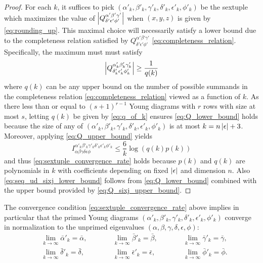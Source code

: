 \documentclass[notitlepage, 10pt]{article}
\begin{document}
\begin{proof}
    For each $k$, it suffices to pick $(\alpha'_k, \beta'_k, \gamma'_k, \delta'_k, \epsilon'_k, \phi'_k)$ be the sextuple which maximizes the value of $\left|Q^{\alpha'\beta'\gamma'}_{\delta'\epsilon'\phi'}\right|$ when $(x,y,z)$ is given by \cref{eq:rounding_up}.
    This maximal choice will necessarily satisfy a lower bound due to the completeness relation satisfied by $Q^{\alpha'\beta'\gamma'}_{\delta'\epsilon'\phi'}$ \cref{eq:completeness_relation}.
    Specifically, the maximum must must satisfy
    \begin{equation}
        \label{eq:Q_lower_bound}
        \left|Q^{\alpha'_k\beta'_k\gamma'_k}_{\delta'_k\epsilon'_k\phi'_k}\right| \geq \frac{1}{q(k)}
    \end{equation}
    where $q(k)$ can be any upper bound on the number of possible summands in the completeness relation \cref{eq:completeness_relation} viewed as a function of $k$.
    As there less than or equal to $(s+1)^{r-1}$ Young diagrams with $r$ rows with size at most $s$, letting $q(k)$ be given by \cref{eq:q_of_k} ensures \cref{eq:Q_lower_bound} holds because the size of any of $(\alpha'_k, \beta'_k, \gamma'_k, \delta'_k, \epsilon'_k, \phi'_k)$ is at most $k=n\left|\epsilon\right| + 3$.
    Moreover, applying \cref{eq:Q_upper_bound} yields
    \begin{equation}
        I^{\alpha'_k\beta'_k\gamma'_k\delta'_k\epsilon'_k\phi'_k}_{\alpha\beta\gamma\delta\epsilon\phi}
        \leq \frac{6}{k}\log (q(k)p(k))
    \end{equation}
    and thus \cref{eq:sextuple_convergence_rate} holds because $p(k)$ and $q(k)$ are polynomials in $k$ with coefficients depending on fixed $\left|\epsilon\right|$ and dimension $n$.
    Also \cref{eq:seq_ud_sixj_lower_bound} follows from \cref{eq:Q_lower_bound} combined with the upper bound provided by \cref{eq:Q_sixj_upper_bound}.
\end{proof}

\begin{rem}
    The convergence condition \cref{eq:sextuple_convergence_rate} above implies in particular that the primed Young diagrams $(\alpha'_k, \beta'_k, \gamma'_k, \delta'_k, \epsilon'_k, \phi'_k)$ converge in normalization to the unprimed eigenvalues $(\alpha,\beta,\gamma,\delta,\epsilon,\phi)$:
    \begin{equation}
        \label{eq:sextuple_convergence}
        \begin{alignedat}{3}
            &\lim_{k\to\infty} \bar \alpha'_k = \bar \alpha, \qquad
            &&\lim_{k\to\infty} \bar \beta'_k = \bar \beta, \qquad
            &&\lim_{k\to\infty} \bar \gamma'_k = \bar \gamma, \\
            &\lim_{k\to\infty} \bar \delta'_k = \bar \delta, \qquad
            &&\lim_{k\to\infty} \bar \epsilon'_k = \bar \epsilon, \qquad
            &&\lim_{k\to\infty} \bar \phi'_k = \bar \phi.
        \end{alignedat}
    \end{equation}
\end{rem}
\end{document}
